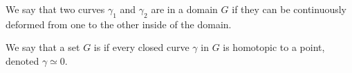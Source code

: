 
\begin{definition}[Homotopic]
	We say that two curves $\gamma_1$ and $\gamma_2$ are  in a domain $G$ if they can be continuously deformed from one to the other inside of the domain.
\end{definition}

\begin{definition}
	We say that a set $G$ is  if every closed curve $\gamma$ in $G$ is homotopic to a point, denoted $\gamma \simeq 0$.
\end{definition}
